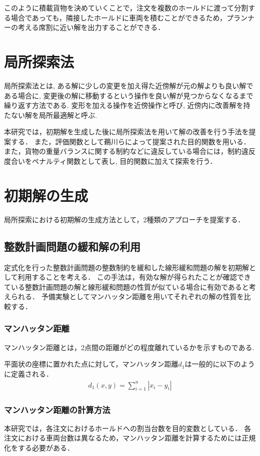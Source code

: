このように積載貨物を決めていくことで，注文を複数のホールドに渡って分割する場合であっても，隣接したホールドに車両を積むことができるため，プランナーの考える席割に近い解を出力することができる．

\section{局所探索法}
局所探索法とは, ある解に少しの変更を加え得た近傍解が元の解よりも良い解である場合に, 変更後の解に移動するという操作を良い解が見つからなくなるまで繰り返す方法である.
変形を加える操作を近傍操作と呼び, 近傍内に改善解を持たない解を局所最適解と呼ぶ.

本研究では，初期解を生成した後に局所探索法を用いて解の改善を行う手法を提案する．
また，評価関数として鵜川ら\cite{ukawa}によって提案された目的関数を用いる．
また，貨物の重量バランスに関する制約などに違反している場合には，制約違反度合いをペナルティ関数として表し, 目的関数に加えて探索を行う．

\section{初期解の生成}
\label{initial}
局所探索における初期解の生成方法として，2種類のアプローチを提案する．
\subsection{整数計画問題の緩和解の利用}
\label{relaxation}
定式化を行った整数計画問題の整数制約を緩和した線形緩和問題の解を初期解として利用することを考える．
この手法は，有効な解が得られたことが確認できている整数計画問題の解と線形緩和問題の性質が似ている場合に有効であると考えられる．
予備実験としてマンハッタン距離を用いてそれぞれの解の性質を比較する．

\subsubsection{マンハッタン距離}
マンハッタン距離とは，2点間の距離がどの程度離れているかを示すものである.

平面状の座標に置かれた点に対して，マンハッタン距離$d_1$は一般的に以下のように定義される．
\begin{align*}
 d_1(x,y) =\sum_{i=1}^n |x_i-y_i|
\end{align*}

\subsubsection{マンハッタン距離の計算方法}
本研究では，各注文におけるホールドへの割当台数を目的変数としている．
各注文における車両台数は異なるため，マンハッタン距離を計算するためには正規化をする必要がある．

